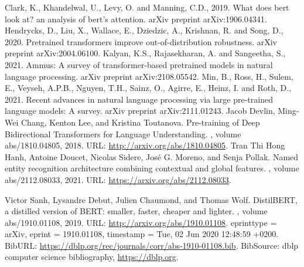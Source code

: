 \documentclass{article}
\begin{document}
\begin{thebibliography}{100} %
     Clark, K., Khandelwal, U., Levy, O. and Manning, C.D., 2019. What does bert look at? an analysis of bert's attention. arXiv preprint arXiv:1906.04341.
     Hendrycks, D., Liu, X., Wallace, E., Dziedzic, A., Krishnan, R. and Song, D., 2020. Pretrained transformers improve out-of-distribution robustness. arXiv preprint arXiv:2004.06100.
     Kalyan, K.S., Rajasekharan, A. and Sangeetha, S., 2021. Ammus: A survey of transformer-based pretrained models in natural language processing. arXiv preprint arXiv:2108.05542.
     Min, B., Ross, H., Sulem, E., Veyseh, A.P.B., Nguyen, T.H., Sainz, O., Agirre, E., Heinz, I. and Roth, D., 2021. Recent advances in natural language processing via large pre-trained language models: A survey. arXiv preprint arXiv:2111.01243.
Jacob Devlin, Ming{-}Wei Chang, Kenton Lee, and Kristina Toutanova.
 Pre-training of Deep Bidirectional Transformers for Language Understanding.
, volume abs/1810.04805, 2018.
\newblock URL: \url{http://arxiv.org/abs/1810.04805}.
Tran Thi Hong Hanh, Antoine Doucet, Nicolas Sidere, Jos{\'{e}} G. Moreno, and Senja Pollak.
\newblock Named entity recognition architecture combining contextual and global features.
, volume abs/2112.08033, 2021.
\newblock URL: \url{https://arxiv.org/abs/2112.08033}.

Victor Sanh, Lysandre Debut, Julien Chaumond, and Thomas Wolf.
\newblock DistilBERT, a distilled version of {BERT:} smaller, faster, cheaper and lighter.
, volume abs/1910.01108, 2019.
\newblock URL: \url{http://arxiv.org/abs/1910.01108}.
\newblock eprinttype = {arXiv}, eprint = {1910.01108}, timestamp = {Tue, 02 Jun 2020 12:48:59 +0200}.
\newblock BibURL: \url{https://dblp.org/rec/journals/corr/abs-1910-01108.bib}.
\newblock BibSource: dblp computer science bibliography, \url{https://dblp.org}.


    
\end{thebibliography}

 
\end{document}
